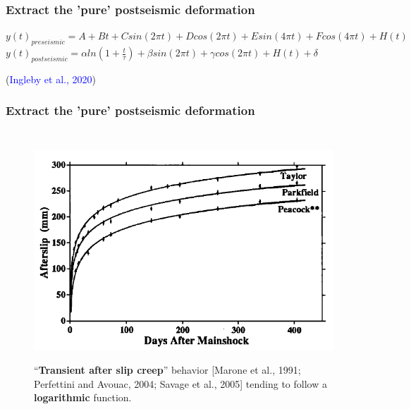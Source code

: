 ﻿\documentclass{beamer}
\begin{document}
\begin{frame}
\frametitle{\textbf{Extract} the 'pure' postseismic deformation}
\small{
$y(t)_{preseismic}=A+Bt+Csin(2\pi t)+Dcos(2\pi t)+Esin(4\pi t)+Fcos(4\pi t)+H(t)$
$y(t)_{postseismic}=\alpha ln(1+\frac{t}{\tau})+\beta sin(2\pi t)+\gamma cos(2\pi t)+H(t)+\delta$
}

(\textcolor{blue}{Ingleby et al., 2020})
\end{frame}

\begin{frame}
\frametitle{\textbf{Extract} the 'pure' postseismic deformation}

\begin{columns}[c] %

\begin{figure}
  \centering
  \includegraphics[scale=0.3]{./pic/Marone1991.png}\\
  \caption{“\textbf{Transient after slip creep}” behavior [Marone et al., 1991;
Perfettini and Avouac, 2004; Savage et al., 2005] tending to follow a \textbf{logarithmic} function.}\label{fig_okada}
\end{figure}


\end{columns}
\end{frame}
\end{document}
